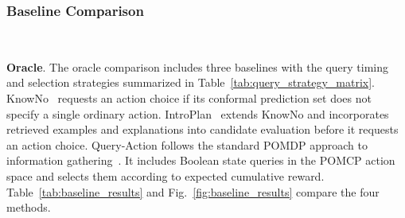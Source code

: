 \subsubsection{Baseline Comparison}~\label{exp:sys_baseline}

\noindent\textbf{Oracle}. The oracle comparison includes three baselines with the query timing and selection strategies summarized in Table~\ref{tab:query_strategy_matrix}. KnowNo~\cite{ren2023robots} requests an action choice if its conformal prediction set does not specify a single ordinary action. IntroPlan~\cite{liang2024introspective} extends KnowNo and incorporates retrieved examples and explanations into candidate evaluation before it requests an action choice. Query-Action follows the standard POMDP approach to information gathering~\cite{kaelbling1998planning}. It includes Boolean state queries in the POMCP action space and selects them according to expected cumulative reward. Table~\ref{tab:baseline_results} and Fig.~\ref{fig:baseline_results} compare the four methods. 

